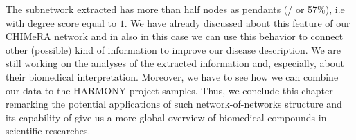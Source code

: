 \documentclass{standalone}
\begin{document}
The subnetwork extracted has more than half nodes as pendants (/ or 57\%), i.e with degree score equal to $1$.
We have already discussed about this feature of our \textsf{CHIMeRA} network and in also in this case we can use this behavior to connect other (possible) kind of information to improve our disease description.
We are still working on the analyses of the extracted information and, especially, about their biomedical interpretation.
Moreover, we have to see how we can combine our data to the HARMONY project samples.
Thus, we conclude this chapter remarking the potential applications of such network-of-networks structure and its capability of give us a more global overview of biomedical compounds in scientific researches.
\end{document}

